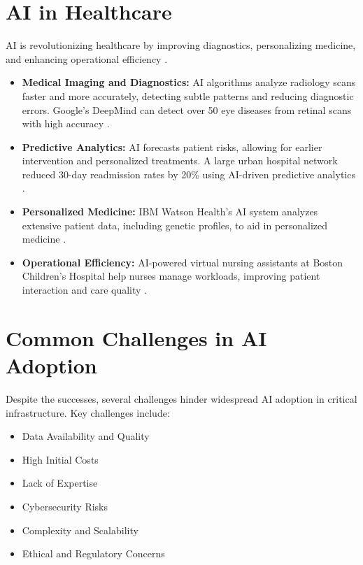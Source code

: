 \section{AI in Healthcare}
AI is revolutionizing healthcare by improving diagnostics, personalizing medicine, and enhancing operational efficiency \parencite{scimedian.in}.
\begin{itemize}
    \item \textbf{Medical Imaging and Diagnostics:} AI algorithms analyze radiology scans faster and more accurately, detecting subtle patterns and reducing diagnostic errors. Google's DeepMind can detect over 50 eye diseases from retinal scans with high accuracy \parencite{scimedian.in}.
    \item \textbf{Predictive Analytics:} AI forecasts patient risks, allowing for earlier intervention and personalized treatments. A large urban hospital network reduced 30-day readmission rates by 20\% using AI-driven predictive analytics \parencite{tezeract.ai}.
    \item \textbf{Personalized Medicine:} IBM Watson Health's AI system analyzes extensive patient data, including genetic profiles, to aid in personalized medicine \parencite{scimedian.in}.
    \item \textbf{Operational Efficiency:} AI-powered virtual nursing assistants at Boston Children's Hospital help nurses manage workloads, improving patient interaction and care quality \parencite{designveloper.com}.
\end{itemize}

\section{Common Challenges in AI Adoption}

Despite the successes, several challenges hinder widespread AI adoption in critical infrastructure. Key challenges include:

\begin{itemize}
    \item Data Availability and Quality
    \item High Initial Costs
    \item Lack of Expertise
    \item Cybersecurity Risks
    \item Complexity and Scalability
    \item Ethical and Regulatory Concerns
\end{itemize}


